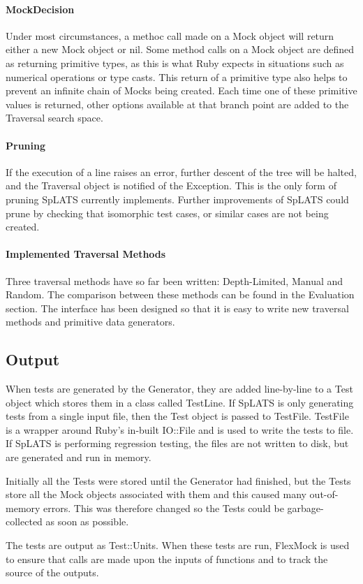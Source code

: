     \paragraph{MockDecision} Under most circumstances, a methoc call made on a Mock object will return either a new Mock object or nil. Some method calls on a Mock object are defined as returning primitive types, as this is what Ruby expects in situations such as numerical operations or type casts. This return of a primitive type also helps to prevent an infinite chain of Mocks being created. Each time one of these primitive values is returned, other options available at that branch point are added to the Traversal search space.    
    
    \paragraph{Pruning} If the execution of a line raises an error, further descent of the tree will be halted, and the Traversal object is notified of the Exception. This is the only form of pruning SpLATS currently implements. Further improvements of SpLATS could prune by checking that isomorphic test cases, or similar cases are not being created. 

    \paragraph{Implemented Traversal Methods} Three traversal methods have so far been written: Depth-Limited, Manual and Random. The comparison between these methods can be found in the Evaluation section. The interface has been designed so that it is easy to write new traversal methods and primitive data generators.

  \subsection{Output}
    When tests are generated by the Generator, they are added line-by-line to a Test object which stores them in a class called TestLine. If SpLATS is only generating tests from a single input file, then the Test object is passed to TestFile. TestFile is a wrapper around Ruby's in-built IO::File and is used to write the tests to file. If SpLATS is performing regression testing, the files are not written to disk, but are generated and run in memory.
    
    Initially all the Tests were stored until the Generator had finished, but the Tests store all the Mock objects associated with them and this caused many out-of-memory errors. This was therefore changed so the Tests could be garbage-collected as soon as possible.
    
    The tests are output as Test::Units. When these tests are run, FlexMock is used to ensure that calls are made upon the inputs of functions and to track the source of the outputs.
